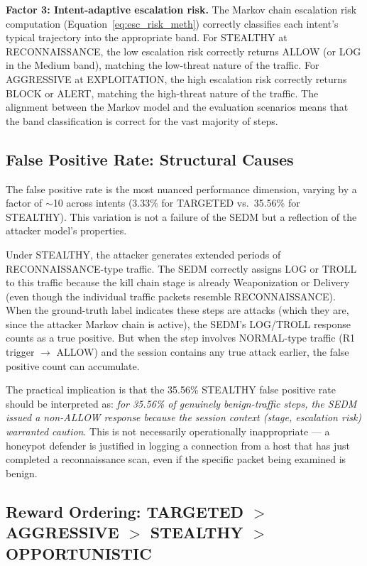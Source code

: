 \textbf{Factor 3: Intent-adaptive escalation risk.}
The Markov chain escalation risk computation (Equation~\ref{eq:esc_risk_meth})
correctly classifies each intent's typical trajectory into the appropriate
band.
For STEALTHY at RECONNAISSANCE, the low escalation risk correctly returns
ALLOW (or LOG in the Medium band), matching the low-threat nature of the
traffic.
For AGGRESSIVE at EXPLOITATION, the high escalation risk correctly returns
BLOCK or ALERT, matching the high-threat nature of the traffic.
The alignment between the Markov model and the evaluation scenarios means
that the band classification is correct for the vast majority of steps.

\subsection{False Positive Rate: Structural Causes}

The false positive rate is the most nuanced performance dimension, varying
by a factor of $\sim$10 across intents (3.33\% for TARGETED vs.\ 35.56\%
for STEALTHY).
This variation is not a failure of the SEDM but a reflection of the
attacker model's properties.

Under STEALTHY, the attacker generates extended periods of
RECONNAISSANCE-type traffic.
The SEDM correctly assigns LOG or TROLL to this traffic because the kill
chain stage is already Weaponization or Delivery (even though the individual
traffic packets resemble RECONNAISSANCE).
When the ground-truth label indicates these steps are attacks (which they
are, since the attacker Markov chain is active), the SEDM's LOG/TROLL
response counts as a true positive.
But when the step involves NORMAL-type traffic (R1 trigger $\to$ ALLOW)
and the session contains any true attack earlier, the false positive
count can accumulate.

The practical implication is that the 35.56\% STEALTHY false positive rate
should be interpreted as: \emph{for 35.56\% of genuinely benign-traffic
steps, the SEDM issued a non-ALLOW response because the session context
(stage, escalation risk) warranted caution}.
This is not necessarily operationally inappropriate --- a honeypot defender
is justified in logging a connection from a host that has just completed
a reconnaissance scan, even if the specific packet being examined is benign.

\subsection{Reward Ordering: TARGETED $>$ AGGRESSIVE $>$ STEALTHY $>$ OPPORTUNISTIC}

